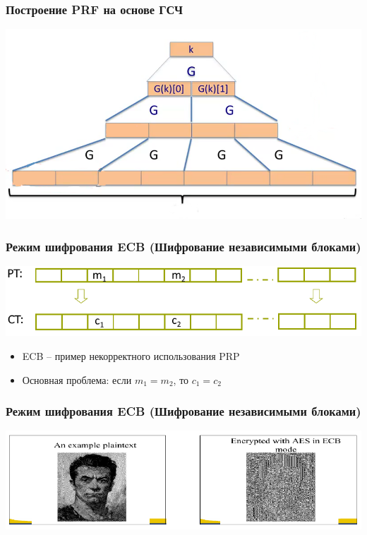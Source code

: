 \documentclass{beamer}
\begin{document}
\begin{frame}
  \frametitle{Построение PRF на основе ГСЧ}

  \includegraphics[width=\linewidth]{images/png/prf_from_prg}

\end{frame}





\begin{frame}
  \frametitle{Режим шифрования ECB (Шифрование независимыми блоками)}

  \includegraphics[width=\linewidth]{images/png/ECB_mode}

  \begin{itemize}
    \item{ECB -- пример некорректного использования PRP}
    \item{Основная проблема: если $m_{1}=m_{2}$, то $c_{1}=c_{2}$}
  \end{itemize}

\end{frame}


\begin{frame}
  \frametitle{Режим шифрования ECB (Шифрование независимыми блоками)}

  \includegraphics[width=\linewidth]{images/png/ECB_failure}

\end{frame}
\end{document}
